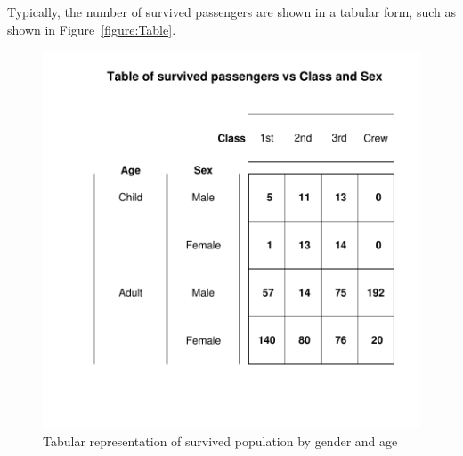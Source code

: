 \documentclass[a4paper]{report}
\begin{document}
\begin{article}



Typically, the number of survived passengers are shown in a
tabular form, such as shown in Figure~\ref{figure:Table}.

\begin{figure}
\includegraphics[width=\textwidth]{Figure1.pdf}
\caption{\label{figure:Figure1}
Tabular representation of survived population by gender and age}
\end{figure}


\end{article}
\end{document}
